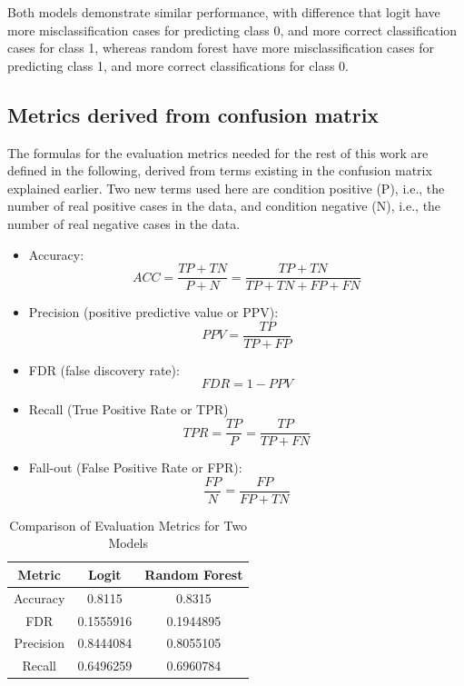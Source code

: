 \documentclass{article}
\providecommand{\tightlist}{%
  \setlength{\itemsep}{0pt}\setlength{\parskip}{0pt}}
\begin{document}
Both models demonstrate similar performance, with difference that logit
have more misclassification cases for predicting class 0, and more
correct classification cases for class 1, whereas random forest have
more misclassification cases for predicting class 1, and more correct
classifications for class 0.

\hypertarget{metrics-derived-from-confusion-matrix}{%
\subsection{Metrics derived from confusion
matrix}\label{metrics-derived-from-confusion-matrix}}

The formulas for the evaluation metrics needed for the rest of this work
are defined in the following, derived from terms existing in the
confusion matrix explained earlier. Two new terms used here are
condition positive (P), i.e., the number of real positive cases in the
data, and condition negative (N), i.e., the number of real negative
cases in the data.

\begin{itemize}
\tightlist
\item
  Accuracy:
  \[ACC = \frac{TP + TN}{P + N} = \frac{TP + TN}{TP + TN + FP + FN}\]
\item
  Precision (positive predictive value or PPV):
  \[PPV = \frac{TP}{TP + FP}\]
\item
  FDR (false discovery rate): \[FDR = 1 - PPV\]
\item
  Recall (True Positive Rate or TPR)
  \[TPR = \frac{TP}{P} = \frac{TP}{TP + FN}\]
\item
  Fall-out (False Positive Rate or FPR):
  \[\frac{FP}{N} = \frac{FP}{FP + TN}\]
\end{itemize}

\begin{table}[h]
\centering
\begin{tabular}{|c|c|c|}
\hline
\textbf{Metric} & \textbf{Logit} & \textbf{Random Forest} \\
\hline
Accuracy & 0.8115 & 0.8315 \\
FDR & 0.1555916 & 0.1944895 \\
Precision & 0.8444084 & 0.8055105 \\
Recall & 0.6496259 & 0.6960784 \\
\hline
\end{tabular}
\caption{Comparison of Evaluation Metrics for Two Models}
\label{tab:comparison}
\end{table}
\end{document}
